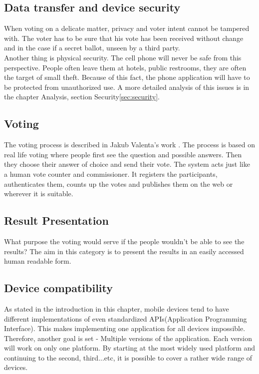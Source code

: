 \documentclass[11pt,twoside,a4paper]{book}
\begin{document}
\subsection{Data transfer and device security}
When voting on a delicate matter, privacy and voter intent cannot be tampered with. The voter has to be sure that his vote has been received without change and in the case if a secret ballot, unseen by a third party. \\
Another thing is physical security. The cell phone will never be safe from this perspective. People often leave them at hotels, public restrooms, they are often the target of small theft. Because of this fact, the phone application will have to be protected from unauthorized use. A more detailed analysis of this issues is in the chapter Analysis, section Security\ref{sec:security}.   \\
\subsection{Voting}
The voting process is described in Jakub Valenta's work \cite{bakalarkaJV} . The process is based on real life voting where people first see the question and possible answers. Then they choose their answer of choice and send their vote. The system acts just like a human vote counter and commissioner. It registers the participants, authenticates them, counts up the votes and publishes them on the web or wherever it is suitable.
\subsection{Result Presentation}
What purpose the voting would serve if the people wouldn't be able to see the results? The aim in this category is to present the results in an easily accessed human readable form.
\subsection{Device compatibility}
As stated in the introduction in this chapter, mobile devices tend to have different implementations of even standardized APIs(Application Programming Interface). This makes implementing one application for all devices impossible. Therefore, another goal is set - Multiple versions of the application.	 Each version will work on only one platform. By starting at the most widely used platform and continuing to the second, third...etc, it is possible to cover a rather wide range of devices.
\end{document}
